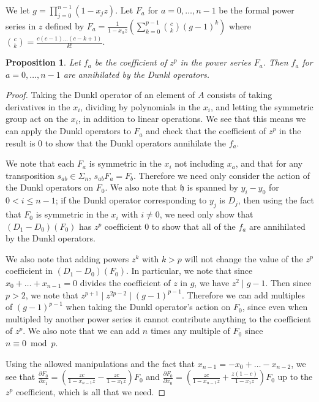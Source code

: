 \documentclass{article}
\numberwithin{equation}{section}
\newtheorem{proposition}[equation]{Proposition}
\begin{document}
We let $g=\prod_{j=0}^{n-1} (1-x_jz)$. Let $F_a$ for $a=0,\dots,n-1$ be the formal power series in $z$ defined by $F_a=\frac{1}{1-x_az} \left( \sum_{k=0}^{p-1} \binom{c}{k}(g-1)^k\right)$ where $\binom{c}{k}=\frac{c(c-1)\dots(c-k+1)}{k!}$. 

\begin{proposition} Let $f_a$ be the coefficient of $z^p$ in the power series $F_a$. Then $f_a$ for $a=0,\dots,n-1$ are annihilated by the Dunkl operators. 
\end{proposition}

\begin{proof}
Taking the Dunkl operator of an element of $A$ consists of taking derivatives in the $x_i$, dividing by polynomials in the $x_i$, and letting the symmetric group act on the $x_i$, in addition to linear operations. We see that this means we can apply the Dunkl operators to $F_a$ and check that the coefficient of $z^p$ in the result is $0$ to show that the Dunkl operators annihilate the $f_a$.

We note that each $F_a$ is symmetric in the $x_i$ not including $x_a$, and that for any transposition $s_{ab} \in \Sigma_n$, $s_{ab}F_a=F_b$. Therefore we need only consider the action of the Dunkl operators on $F_0$. We also note that $\mathfrak{h}$ is spanned by $y_i-y_0$ for $0 < i \le n-1$; if the Dunkl operator corresponding to $y_j$ is $D_j$, then using the fact that $F_0$ is symmetric in the $x_i$ with $i \ne 0$, we need only show that $(D_1-D_0)(F_0)$ has $z^p$ coefficient $0$ to show that all of the $f_a$ are annihilated by the Dunkl operators. 

We also note that adding powers $z^k$ with $k > p$ will not change the value of the $z^p$ coefficient in $(D_1-D_0)(F_0)$. In particular, we note that since $x_0+\dots+x_{n-1}=0$ divides the coefficient of $z$ in $g$, we have $z^2 \mid g-1$. Then since $p>2$, we note that $z^{p+1} \mid z^{2p-2} \mid (g-1)^{p-1}$. Therefore we can add multiples of $(g-1)^{p-1}$ when taking the Dunkl operator's action on $F_0$, since even when multipled by another power series it cannot contribute anything to the coefficient of $z^p$. We also note that we can add $n$ times any multiple of $F_0$ since $n \equiv 0 \bmod p$. 

Using the allowed manipulations and the fact that $x_{n-1}=-x_0+\dots-x_{n-2}$, we see that $\frac{\partial F_0}{\partial x_1}=\left(\frac{zc}{1-x_{n-1}z}-\frac{zc}{1-x_1z}\right)F_0$ and $\frac{\partial F_0}{\partial x_0}=\left(\frac{zc}{1-x_{n-1}z}+\frac{z(1-c)}{1-x_1z}\right)F_0$ up to the $z^p$ coefficient, which is all that we need.


\end{proof}
\end{document}
